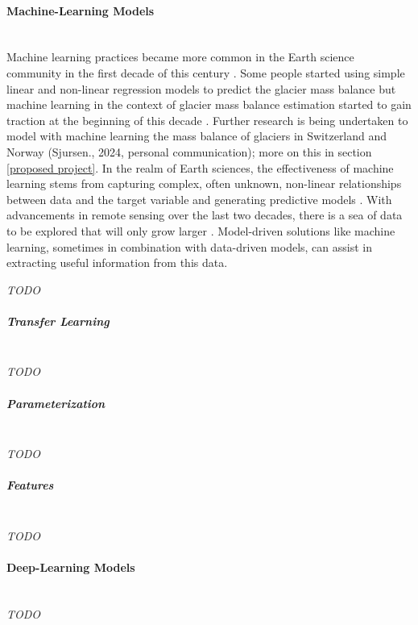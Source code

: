 \paragraph{Machine-Learning Models}\label{machine learning}\mbox{}\vspace{2mm} \\
Machine learning practices became more common in the Earth science community in the first decade of this century \cite{dramsch-2020}. Some people started using simple linear and non-linear regression models to predict the glacier mass balance \cite{fountain-1999, aalgeirsdottir-2003} but machine learning in the context of glacier mass balance estimation started to gain traction at the beginning of this decade \cite{mutz-2022, guidicelli-2023, anilkumar-2023, diaconu-2024, ren-2024}. Further research is being undertaken to model with machine learning the mass balance of glaciers in Switzerland and Norway \cite{van-der-meer-2024} (Sjursen., 2024, personal communication); more on this in section \ref{proposed project}. In the realm of Earth sciences, the effectiveness of machine learning stems from capturing complex, often unknown, non-linear relationships between data and the target variable and generating predictive models \cite{bergen-2019}. With advancements in remote sensing over the last two decades, there is a sea of data to be explored that will only grow larger \cite{chi-2016}. Model-driven solutions like machine learning, sometimes in combination with data-driven models, can assist in extracting useful information from this data.  

\textit{TODO}

\subparagraph{Transfer Learning}\label{transfer learning}\mbox{} \\

\textit{TODO}

\subparagraph{Parameterization}\mbox{} \\

\textit{TODO}

\subparagraph{Features}\mbox{} \\

\textit{TODO}

\paragraph{Deep-Learning Models}\mbox{} \\

\textit{TODO}
\clearpage


